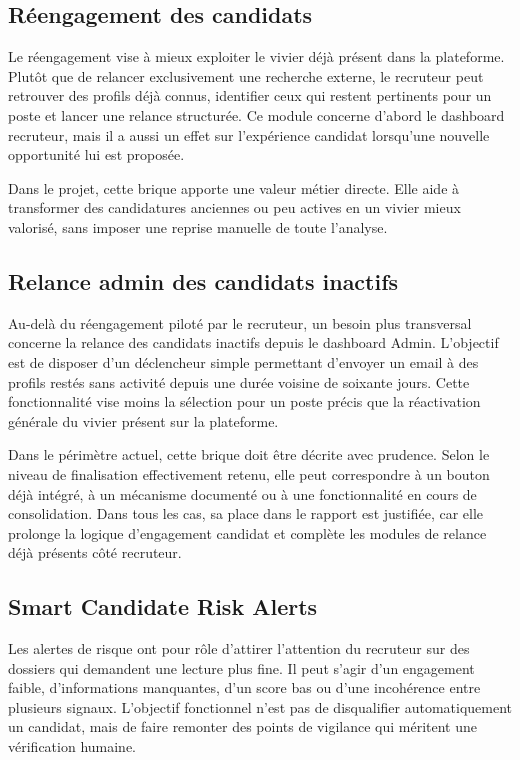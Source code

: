 \subsection{Réengagement des candidats}

Le réengagement vise à mieux exploiter le vivier déjà présent dans la plateforme. Plutôt que de relancer exclusivement une recherche externe, le recruteur peut retrouver des profils déjà connus, identifier ceux qui restent pertinents pour un poste et lancer une relance structurée. Ce module concerne d'abord le dashboard recruteur, mais il a aussi un effet sur l'expérience candidat lorsqu'une nouvelle opportunité lui est proposée.

Dans le projet, cette brique apporte une valeur métier directe. Elle aide à transformer des candidatures anciennes ou peu actives en un vivier mieux valorisé, sans imposer une reprise manuelle de toute l'analyse.

\subsection{Relance admin des candidats inactifs}

Au-delà du réengagement piloté par le recruteur, un besoin plus transversal concerne la relance des candidats inactifs depuis le dashboard Admin. L'objectif est de disposer d'un déclencheur simple permettant d'envoyer un email à des profils restés sans activité depuis une durée voisine de soixante jours. Cette fonctionnalité vise moins la sélection pour un poste précis que la réactivation générale du vivier présent sur la plateforme.

Dans le périmètre actuel, cette brique doit être décrite avec prudence. Selon le niveau de finalisation effectivement retenu, elle peut correspondre à un bouton déjà intégré, à un mécanisme documenté ou à une fonctionnalité en cours de consolidation. Dans tous les cas, sa place dans le rapport est justifiée, car elle prolonge la logique d'engagement candidat et complète les modules de relance déjà présents côté recruteur.

\subsection{Smart Candidate Risk Alerts}

Les alertes de risque ont pour rôle d'attirer l'attention du recruteur sur des dossiers qui demandent une lecture plus fine. Il peut s'agir d'un engagement faible, d'informations manquantes, d'un score bas ou d'une incohérence entre plusieurs signaux. L'objectif fonctionnel n'est pas de disqualifier automatiquement un candidat, mais de faire remonter des points de vigilance qui méritent une vérification humaine.

